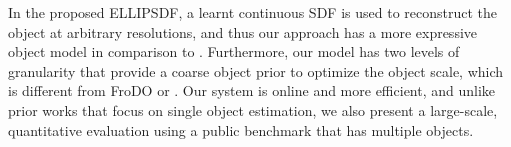 In the proposed ELLIPSDF, a learnt continuous SDF is used to reconstruct the object at arbitrary resolutions, and thus our approach has a more expressive object model in comparison to \cite{hu2019deep, sucar2020nodeslam}. 
Furthermore, our model has two levels of granularity that provide a coarse object prior to optimize the object scale, which is different from FroDO or \cite{afolabi2020extending}. 
Our system is online and more efficient, and unlike prior works that focus on single object estimation, we also present a large-scale, quantitative evaluation using a public benchmark that has multiple objects. 
